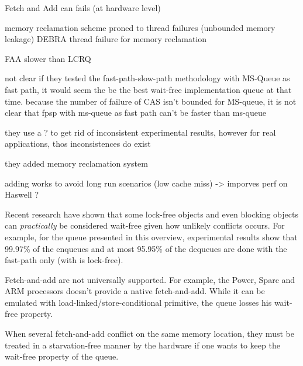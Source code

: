 
Fetch and Add can fails (at hardware level)

memory reclamation scheme proned to thread failures (unbounded memory leakage)
DEBRA thread failure for memory reclamation

FAA slower than LCRQ

not clear if they tested the fast-path-slow-path methodology with MS-Queue as
fast path, it would seem the be the best wait-free implementation queue at that
time. because the number of failure of CAS isn't bounded for MS-queue, it is not
clear that fpsp with ms-queue as fast path can't be faster than ms-queue

they use a ? to get rid of inconsistent experimental results, however for real
applications, thos inconsistences do exist

they added memory reclamation system

adding works to avoid long run scenarios (low cache miss) -> imporves perf on
Haswell ?


Recent research have shown that some lock-free objects and even blocking objects
can \textit{practically} be considered wait-free
\cite{David:2016:CSD:2935764.2935774} \cite{Alistarh:2016:LCA:2997039.2903136}
given how unlikely conflicts occurs. For example, for the queue presented in
this overview, experimental results show that 99.97\% of the enqueues and at
most 95.95\% of the dequeues are done with the fast-path only (with is
lock-free).

Fetch-and-add are not universally supported. For example, the Power, Sparc and
ARM processors doesn't provide a native fetch-and-add. While it can be emulated
with load-linked/store-conditional primitive, the queue losses his wait-free
property.

When several fetch-and-add conflict on the same memory location, they must be
treated in a starvation-free manner by the hardware if one wants to keep the
wait-free property of the queue.
